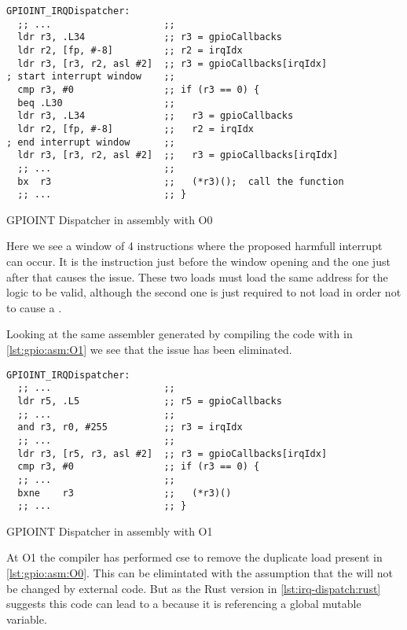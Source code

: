 \begin{listing}[H]
  \begin{verbatim}
GPIOINT_IRQDispatcher:
  ;; ...                    ;;
  ldr r3, .L34              ;; r3 = gpioCallbacks
  ldr r2, [fp, #-8]         ;; r2 = irqIdx
  ldr r3, [r3, r2, asl #2]  ;; r3 = gpioCallbacks[irqIdx]
; start interrupt window    ;;
  cmp r3, #0                ;; if (r3 == 0) {
  beq .L30                  ;;
  ldr r3, .L34              ;;   r3 = gpioCallbacks
  ldr r2, [fp, #-8]         ;;   r2 = irqIdx
; end interrupt window      ;;
  ldr r3, [r3, r2, asl #2]  ;;   r3 = gpioCallbacks[irqIdx]
  ;; ...                    ;;
  bx  r3                    ;;   (*r3)();  call the function
  ;; ...                    ;; }
  \end{verbatim}
  \caption{GPIOINT Dispatcher in assembly with O0}
  \label{lst:gpio:asm:O0}
\end{listing}

Here we see a window of 4 instructions where the proposed harmfull interrupt can occur.
It is the  instruction just before the window opening and the one just after that causes the issue.
These two loads must load the same address for the logic to be valid, although the second one is just required to not load  in order not to cause a .

Looking at the same assembler generated by compiling the code with  in \autoref{lst:gpio:asm:O1} we see that the issue has been eliminated.

\begin{listing}[H]
  \begin{verbatim}
GPIOINT_IRQDispatcher:
  ;; ...                    ;;
  ldr r5, .L5               ;; r5 = gpioCallbacks
  ;; ...                    ;;
  and r3, r0, #255          ;; r3 = irqIdx
  ;; ...                    ;;
  ldr r3, [r5, r3, asl #2]  ;; r3 = gpioCallbacks[irqIdx]
  cmp r3, #0                ;; if (r3 == 0) {
  ;; ...                    ;;
  bxne    r3                ;;   (*r3)()
  ;; ...                    ;; }
  \end{verbatim}
  \caption{GPIOINT Dispatcher in assembly with O1}
  \label{lst:gpio:asm:O1}
\end{listing}

At O1 the compiler has performed \gls{cse} to remove the duplicate load present in \autoref{lst:gpio:asm:O0}.
This can be elimintated with the assumption that the  will not be changed by external code.
But as the Rust version in \autoref{lst:irq-dispatch:rust} suggests this code can lead to a  because it is referencing a global mutable variable.

